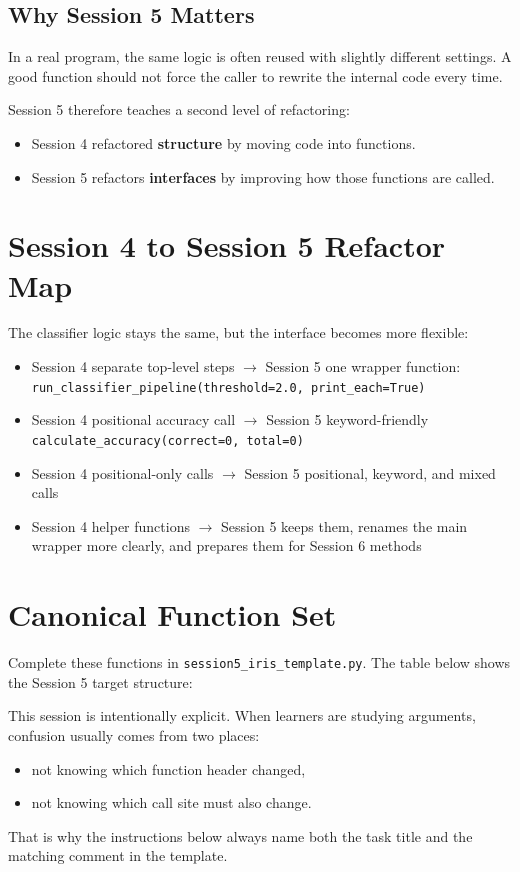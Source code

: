 \subsection{Why Session 5 Matters}
In a real program, the same logic is often reused with slightly different settings. A good function should not force the caller to rewrite the internal code every time.

Session 5 therefore teaches a second level of refactoring:
\begin{itemize}
    \item Session 4 refactored \textbf{structure} by moving code into functions.
    \item Session 5 refactors \textbf{interfaces} by improving how those functions are called.
\end{itemize}

\section{Session 4 to Session 5 Refactor Map}
The classifier logic stays the same, but the interface becomes more flexible:
\begin{itemize}
    \item Session 4 separate top-level steps $\rightarrow$ Session 5 one wrapper function: \texttt{run\_classifier\_pipeline(threshold=2.0, print\_each=True)}
    \item Session 4 positional accuracy call $\rightarrow$ Session 5 keyword-friendly \texttt{calculate\_accuracy(correct=0, total=0)}
    \item Session 4 positional-only calls $\rightarrow$ Session 5 positional, keyword, and mixed calls
    \item Session 4 helper functions $\rightarrow$ Session 5 keeps them, renames the main wrapper more clearly, and prepares them for Session 6 methods
\end{itemize}

\section{Canonical Function Set}
Complete these functions in \texttt{session5\_iris\_template.py}. The table below shows the Session 5 target structure:



\begin{tcolorbox}[title=Good Practice]
This session is intentionally explicit. When learners are studying arguments, confusion usually comes from two places:
\begin{itemize}
    \item not knowing which function header changed,
    \item not knowing which call site must also change.
\end{itemize}
That is why the instructions below always name both the task title and the matching comment in the template.
\end{tcolorbox}

